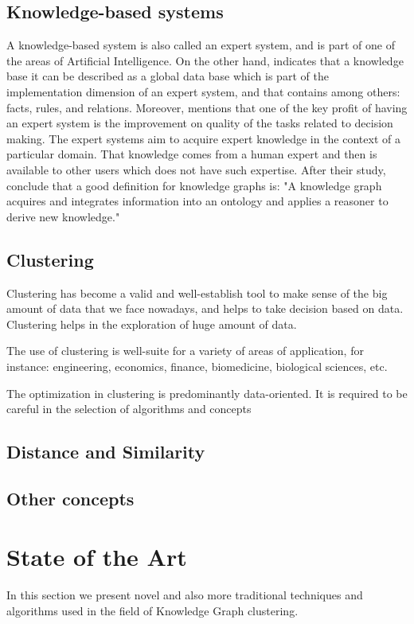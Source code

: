 \documentclass[runningheads]{llncs}
\begin{document}
\subsection{Knowledge-based systems}
A knowledge-based system is also called an expert system, and is part of one of the areas of Artificial Intelligence.\cite{Tripathi}
On the other hand, \cite{Engelmore} indicates that a knowledge base it can be described as a global data base which is part of the implementation dimension of an expert system, and that contains among others: facts, rules, and relations. Moreover, \cite{Engelmore} mentions that one of the key profit of having an expert system is the improvement on quality of the tasks related to decision making.
The expert systems aim to acquire expert knowledge in the context of a particular domain. That knowledge comes from a human expert and then is available to other users which does not have such expertise. \cite{Tripathi}
After their study, \cite{Ehrlinger}  conclude that a good definition for knowledge graphs is: "A knowledge graph acquires and integrates information into an ontology and applies a reasoner to derive new knowledge."

\subsection{Clustering}
Clustering has become a valid and well-establish tool to make sense of the big amount of data that we face nowadays, and helps to take decision based on data. Clustering helps in the exploration of huge amount of data. \cite{Pedrycz}

The use of clustering is well-suite for a variety of areas of application, for instance: engineering, economics, finance, biomedicine, biological sciences, etc. \cite{Pedrycz}

The optimization in clustering is predominantly data-oriented. \cite{Pedrycz}
It is required to be careful in the selection of algorithms and concepts 

\subsection{Distance and Similarity}

\subsection{Other concepts}

\section{State of the Art}
In this section we present novel and also more traditional techniques and algorithms used in the field of Knowledge Graph clustering. 
\end{document}

